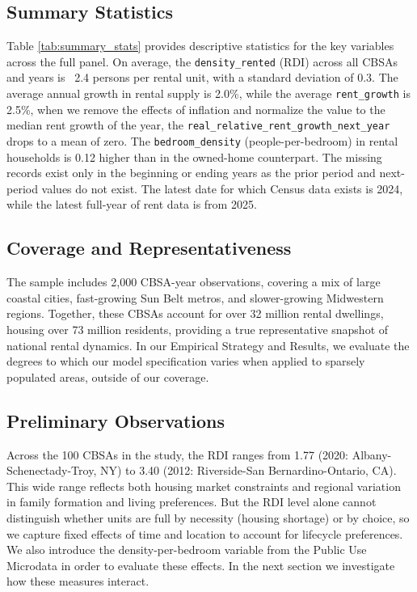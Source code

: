 \documentclass[pdflatex,sn-basic]{sn-jnl}%
\theoremstyle{thmstyleone}%
\theoremstyle{thmstyletwo}%
\theoremstyle{thmstylethree}%
\begin{document}


\subsection{Summary Statistics}


Table \ref{tab:summary_stats} provides descriptive statistics for the key variables across the full panel. On average, the \texttt{density\_rented} (RDI) across all CBSAs and years is ~2.4 persons per rental unit, with a standard deviation of 0.3. The average annual growth in rental supply is 2.0\%, while the average \texttt{rent\_growth} is 2.5\%, when we remove the effects of inflation and normalize the value to the median rent growth of the year, the \texttt{real\_relative\_rent\_growth\_next\_year} drops to a mean of zero. The \texttt{bedroom\_density} (people-per-bedroom) in rental households is 0.12 higher than in the owned-home counterpart. The missing records exist only in the beginning or ending years as the prior period and next-period values do not exist. The latest date for which Census data exists is 2024, while the latest full-year of rent data is from 2025. 

\label{summary_stats}

\subsection{Coverage and Representativeness}
The sample includes 2,000 CBSA-year observations, covering a mix of large coastal cities, fast-growing Sun Belt metros, and slower-growing Midwestern regions. Together, these CBSAs account for over 32 million rental dwellings, housing over 73 million residents, providing a true representative snapshot of national rental dynamics. In our Empirical Strategy and Results, we evaluate the degrees to which our model specification varies when applied to sparsely populated areas, outside of our coverage. 

\subsection{Preliminary Observations}

Across the 100 CBSAs in the study, the RDI ranges from 1.77 (2020: Albany-Schenectady-Troy, NY) to 3.40 (2012: Riverside-San Bernardino-Ontario, CA). This wide range reflects both housing market constraints and regional variation in family formation and living preferences. But the RDI level alone cannot distinguish whether units are full by necessity (housing shortage) or by choice, so we capture fixed effects of time and location to account for lifecycle preferences. We also introduce the density-per-bedroom variable from the Public Use Microdata in order to evaluate these effects. In the next section we investigate how these measures interact. 
\end{document}
